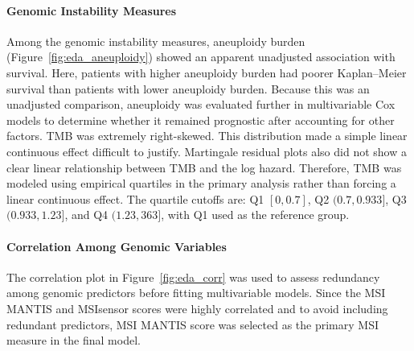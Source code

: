 \documentclass[paper=a4, fontsize=11pt]{scrartcl}
\numberwithin{equation}{section}		%
\numberwithin{figure}{section}			%
\numberwithin{table}{section}				%
\begin{document}
\paragraph{Genomic Instability Measures} Among the genomic instability measures, aneuploidy burden (Figure~\ref{fig:eda_aneuploidy}) showed an apparent unadjusted association with survival. Here, patients with higher aneuploidy burden had poorer Kaplan--Meier survival than patients with lower aneuploidy burden. Because this was an unadjusted comparison, aneuploidy was evaluated further in multivariable Cox models to determine whether it remained prognostic after accounting for other factors. TMB was extremely right-skewed. This distribution made a simple linear continuous effect difficult to justify. Martingale residual plots also did not show a clear linear relationship between TMB and the log hazard. Therefore, TMB was modeled using empirical quartiles in the primary analysis rather than forcing a linear continuous effect. The quartile cutoffs are: Q1 $[0,0.7]$, Q2 $(0.7,0.933]$, Q3 $(0.933,1.23]$, and Q4 $(1.23,363]$, with Q1 used as the reference group.

\paragraph{Correlation Among Genomic Variables}  The correlation plot in Figure~\ref{fig:eda_corr} was used to assess redundancy among genomic predictors before fitting multivariable models. Since the MSI MANTIS and MSIsensor scores were highly correlated and to avoid including redundant predictors, MSI MANTIS score was selected as the primary MSI measure in the final model. 
\end{document}
